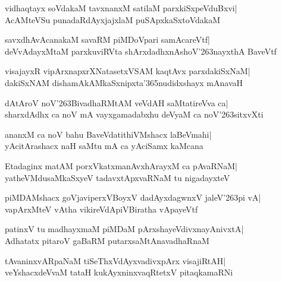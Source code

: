 \documentclass[twoside,12pt,openright]{book}
\newcounter{shloka}[chapter]
\begin{document}
\begin{shloka}%
vidhaqtayx soVdakaM tavxnanxM satilaM parxkiSxpeVduBxvi|\\
AcAMteVSu punadaRdAyxjajxlaM puSApxkaSxtoVdakaM
\end{shloka}

\begin{shloka}%
savxdhAvAcanakaM savaRM piMDoVpari samAcareVtf|\\
deVvAdayxMtaM parxkuviRVta shArxdadhxnAshoV\char'263nayxthA BaveVtf
\end{shloka}

\begin{shloka}%
visajayxR vipArxnapxrXNatasetxVSAM kaqtAvx parxdakiSxNaM|\\
dakiSxNAM dishamAkAMkaSxnipxta\char'365nudidxshayx mAnavaH
\end{shloka}

\begin{shloka}%
dAtAroV noV\char'263BivadhaRMtAM veVdAH saMtatireVva ca|\\
sharxdAdhx ca noV mA vayxgamadabxhu deVyaM ca noV\char'263sitxvXti
\end{shloka}

\begin{shloka}%
ananxM ca noV bahu BaveVdatithiVMshacx laBeVmahi|\\
yAcitArashacx naH saMtu mA ca yAciSamx kaMcana
\end{shloka}

\begin{shloka}%
Etadaginx matAM porxVkatxmanAvxhArayxM ca pAvaRNaM|\\
yatheVMdusaMkaSxyeV tadavxtApxvaRNaM tu nigadayxteV
\end{shloka}

\begin{shloka}%
piMDAMshacx goVjaviperxVBoyxV dadAyxdagwnxV jaleV\char'263pi vA|\\
vapArxMteV vAtha vikireVdApiVBiratha vApayeVtf
\end{shloka}

\begin{shloka}%
patinxV tu madhayxmaM piMDaM pArxshayeVdivxnayAnivxtA|\\
Adhatatx pitaroV gaBaRM putarxsaMtAnavadhaRnaM
\end{shloka}

\begin{shloka}%
tAvaninxvARpaNaM tiSeThxVdAyxvadivxpArx visajiRtAH|\\
veYshacxdeVvaM tataH kukAyxninxvaqRtetxV pitaqkamaRNi
\end{shloka}
\end{document}
